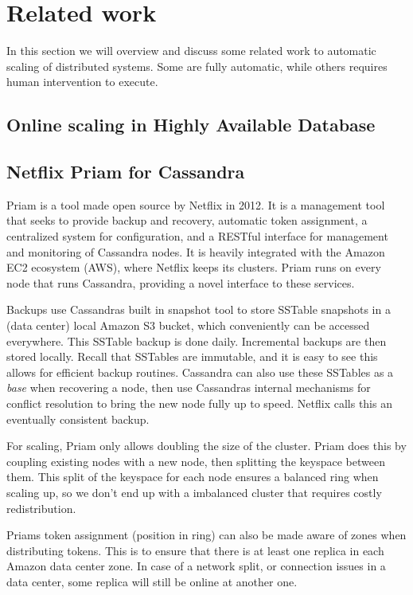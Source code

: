 \section{Related work}
\label{sec:related_work}
In this section we will overview and discuss some related work to automatic scaling of distributed systems. Some are fully automatic, while others requires human intervention to execute.

\subsection{Online scaling in Highly Available Database}


\subsection{Netflix Priam for Cassandra}
Priam is a tool made open source by Netflix in 2012. It is a management tool that seeks to provide backup and recovery, automatic token assignment, a centralized system for configuration, and a RESTful interface for management and monitoring of Cassandra nodes. It is heavily integrated with the Amazon EC2 ecosystem (AWS), where Netflix keeps its clusters.
Priam runs on every node that runs Cassandra, providing a novel interface to these services.

Backups use Cassandras built in snapshot tool to store SSTable snapshots in a (data center) local Amazon S3 bucket, which conveniently can be accessed everywhere.
This SSTable backup is done daily. Incremental backups are then stored locally. Recall that SSTables are immutable, and it is easy to see this allows for efficient backup routines. Cassandra can also use these SSTables as a \emph{base} when recovering a node, then use Cassandras internal mechanisms for conflict resolution to bring the new node fully up to speed. Netflix calls this an eventually consistent backup.

For scaling, Priam only allows doubling the size of the cluster. Priam does this by coupling existing nodes with a new node, then splitting the keyspace between them. This split of the keyspace for each node ensures a balanced ring when scaling up, so we don't end up with a imbalanced cluster that requires costly redistribution.

Priams token assignment (position in ring) can also be made aware of zones when distributing tokens. This is to ensure that there is at least one replica in each Amazon data center zone. In case of a network split, or connection issues in a data center, some replica will still be online at another one.


